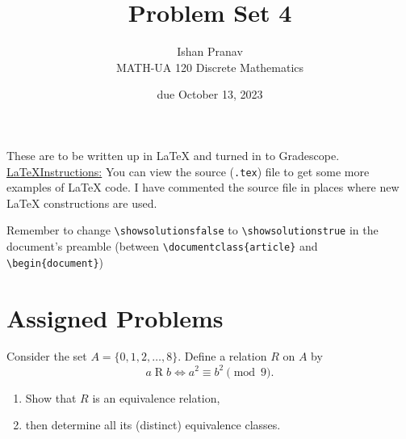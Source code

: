 \documentclass{article}
\title{Problem Set 4}
\author{%
    Ishan Pranav
\\  MATH-UA 120 Discrete Mathematics
}
\date{due October 13, 2023}
\newif\ifshowsolutions
\newcommand{\danger}{\marginpar[\hfill\dbend]{\dbend\hfill}}
\theoremstyle{definition}
\begin{document}
\maketitle
These are to be written up in \LaTeX{} and turned in to Gradescope.\\
\ifshowsolutions
    \SetupExSheets{solution/print=true}
\else
    \danger
 \underline{ \LaTeX  Instructions:}  You can view the source (\texttt{.tex}) file to get some more examples of \LaTeX{} code.  I have commented the source file in places where new \LaTeX{} constructions are used.
  
  Remember to change \verb|\showsolutionsfalse| to \verb|\showsolutionstrue|
    in the document's preamble 
    (between \verb|\documentclass{article}| and \verb|\begin{document}|)
\fi
\section*{Assigned Problems}
\begin{question}
    Consider the set $A = \{0, 1, 2, \dots, 8 \}$. Define a relation $R$ on $A$ by
	\[
	a\mathrel{R}b \iff a^2 \equiv b^2 \pmod{9}.
	\]
	\begin{enumerate}
	\item Show that $R$ is an equivalence relation, 
	\item then determine all its (distinct) equivalence classes.
	\end{enumerate}
\end{question}
\end{document}
